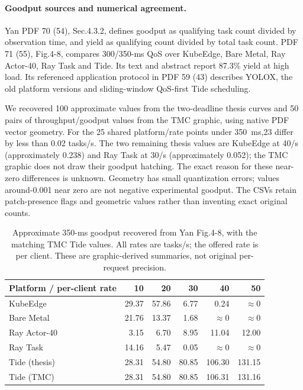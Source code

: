 \paragraph{Goodput sources and numerical agreement.}
Yan PDF 70 (54), Sec.4.3.2, defines goodput as qualifying task count divided by observation time, and yield as qualifying count divided by total task count. PDF 71 (55), Fig.4-8, compares 300/350-ms QoS over KubeEdge, Bare Metal, Ray Actor-40, Ray Task and Tide. Its text and abstract report 87.3\% yield at high load. Its referenced application protocol in PDF 59 (43) describes YOLOX, the old platform versions and sliding-window QoS-first Tide scheduling.

We recovered 100 approximate values from the two-deadline thesis curves and 50 pairs of throughput/goodput values from the TMC graphic, using native PDF vector geometry. For the 25 shared platform/rate points under 350~ms,23 differ by less than 0.02 tasks/s. The two remaining thesis values are KubeEdge at 40/s (approximately 0.238) and Ray Task at 30/s (approximately 0.052); the TMC graphic does not draw their goodput hatching. The exact reason for these near-zero differences is unknown. Geometry has small quantization errors; values around-0.001 near zero are not negative experimental goodput. The CSVs retain patch-presence flags and geometric values rather than inventing exact original counts.

\begin{table}[htbp]
\centering\small
\caption{Approximate 350-ms goodput recovered from Yan Fig.4-8, with the matching TMC Tide values. All rates are tasks/s; the offered rate is per client. These are graphic-derived summaries, not original per-request precision.}
\label{tab:historical-source-goodput}
\begin{tabular}{lrrrrr}
\toprule
Platform / per-client rate &10&20&30&40&50\\
\midrule
KubeEdge &29.37&57.86&6.77&0.24&$\approx 0$\\
Bare Metal &21.76&13.37&1.68&$\approx 0$&$\approx 0$\\
Ray Actor-40 &3.15&6.70&8.95&11.04&12.00\\
Ray Task &14.16&5.47&0.05&$\approx 0$&$\approx 0$\\
Tide (thesis) &28.31&54.80&80.85&106.30&131.15\\
Tide (TMC) &28.31&54.80&80.85&106.31&131.16\\
\bottomrule
\end{tabular}
\end{table}

